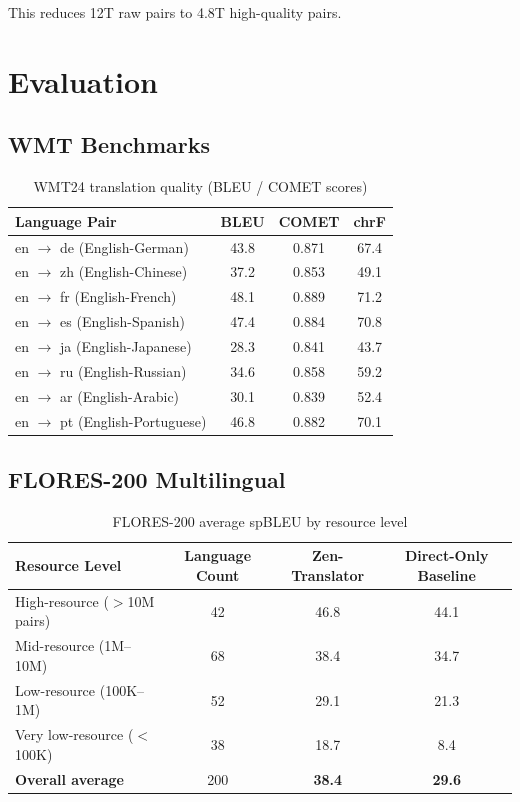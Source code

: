 \documentclass[11pt,a4paper]{article}
\begin{document}
This reduces 12T raw pairs to 4.8T high-quality pairs.

\section{Evaluation}
\label{sec:eval}

\subsection{WMT Benchmarks}

\begin{table}[H]
\centering
\caption{WMT24 translation quality (BLEU / COMET scores)}
\begin{tabular}{lccc}
\toprule
\textbf{Language Pair} & \textbf{BLEU} & \textbf{COMET} & \textbf{chrF} \\
\midrule
en $\to$ de (English-German)    & 43.8 & 0.871 & 67.4 \\
en $\to$ zh (English-Chinese)   & 37.2 & 0.853 & 49.1 \\
en $\to$ fr (English-French)    & 48.1 & 0.889 & 71.2 \\
en $\to$ es (English-Spanish)   & 47.4 & 0.884 & 70.8 \\
en $\to$ ja (English-Japanese)  & 28.3 & 0.841 & 43.7 \\
en $\to$ ru (English-Russian)   & 34.6 & 0.858 & 59.2 \\
en $\to$ ar (English-Arabic)    & 30.1 & 0.839 & 52.4 \\
en $\to$ pt (English-Portuguese) & 46.8 & 0.882 & 70.1 \\
\bottomrule
\end{tabular}
\label{tab:wmt}
\end{table}

\subsection{FLORES-200 Multilingual}

\begin{table}[H]
\centering
\caption{FLORES-200 average spBLEU by resource level}
\begin{tabular}{lccc}
\toprule
\textbf{Resource Level} & \textbf{Language Count} & \textbf{Zen-Translator} & \textbf{Direct-Only Baseline} \\
\midrule
High-resource ($>$10M pairs)  & 42 & 46.8 & 44.1 \\
Mid-resource (1M--10M)        & 68 & 38.4 & 34.7 \\
Low-resource (100K--1M)       & 52 & 29.1 & 21.3 \\
Very low-resource ($<$100K)   & 38 & 18.7 & 8.4  \\
\textbf{Overall average}      & 200 & \textbf{38.4} & \textbf{29.6} \\
\bottomrule
\end{tabular}
\label{tab:flores}
\end{table}
\end{document}
